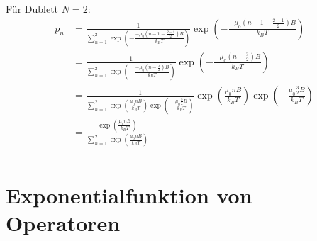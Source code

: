 \documentclass[a4paper,11pt]{article}
\begin{document}
Für Dublett $N=2$:
\begin{equation}
\begin{aligned}
p_n &= \frac{1}{\sum_{n=1}^2 \exp \left( -\frac{-\mu_0 \left( n-1-\frac{2-1}{2} \right) B }{k_B T} \right)} \exp \left( -\frac{-\mu_0 \left( n-1-\frac{2-1}{2} \right) B}{k_B T} \right) \\
    &= \frac{1}{\sum_{n=1}^2 \exp \left( -\frac{-\mu_0 \left( n-\frac{3}{2} \right) B }{k_B T} \right)} \exp \left( -\frac{-\mu_0 \left( n-\frac{3}{2} \right) B}{k_B T} \right) \\
    &= \frac{1}{\sum_{n=1}^2 \exp \left( \frac{\mu_0 n B }{k_B T} \right)\exp \left( -\frac{\mu_0 \frac{3}{2} B }{k_B T} \right)} \exp \left( \frac{\mu_0 n B }{k_B T} \right)\exp \left( -\frac{\mu_0 \frac{3}{2} B }{k_B T} \right) \\
    &= \frac{\exp \left( \frac{\mu_0 n B }{k_B T} \right)}{\sum_{n=1}^2 \exp \left( \frac{\mu_0 n B }{k_B T} \right)} \\
\end{aligned}
\end{equation}

\subsection{}

\subsection{}

\subsection{}

\section{Exponentialfunktion von Operatoren}

\subsection{}

\subsection{}

\subsection{}
\end{document}
